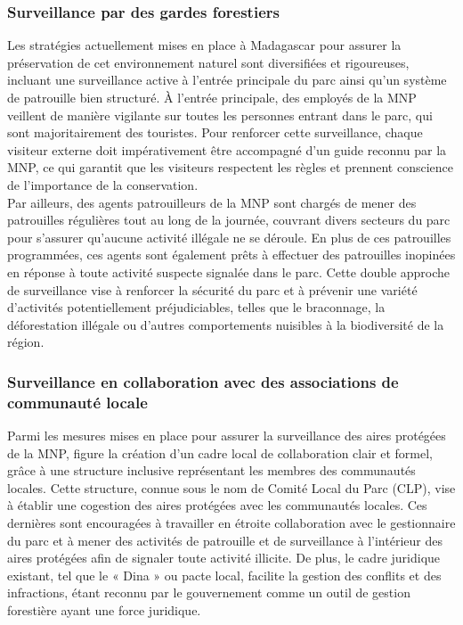 \subsubsection{Surveillance par des gardes forestiers}
Les stratégies actuellement mises en place à Madagascar pour assurer la préservation de cet environnement naturel sont diversifiées et rigoureuses, incluant une surveillance active à l'entrée principale du parc ainsi qu'un système de patrouille bien structuré. À l'entrée principale, des employés de la MNP veillent de manière vigilante sur toutes les personnes entrant dans le parc, qui sont majoritairement des touristes. Pour renforcer cette surveillance, chaque visiteur externe doit impérativement être accompagné d'un guide reconnu par la MNP, ce qui garantit que les visiteurs respectent les règles et prennent conscience de l'importance de la conservation. 
\\
Par ailleurs, des agents patrouilleurs de la MNP sont chargés de mener des patrouilles régulières tout au long de la journée, couvrant divers secteurs du parc pour s'assurer qu'aucune activité illégale ne se déroule. En plus de ces patrouilles programmées, ces agents sont également prêts à effectuer des patrouilles inopinées en réponse à toute activité suspecte signalée dans le parc. Cette double approche de surveillance vise à renforcer la sécurité du parc et à prévenir une variété d'activités potentiellement préjudiciables, telles que le braconnage, la déforestation illégale ou d'autres comportements nuisibles à la biodiversité de la région.
 
\subsubsection{Surveillance en collaboration avec des associations de communauté locale} 
Parmi les mesures mises en place pour assurer la surveillance des aires protégées de la MNP, figure la création d'un cadre local de collaboration clair et formel, grâce à une structure inclusive représentant les membres des communautés locales. Cette structure, connue sous le nom de Comité Local du Parc (CLP), vise à établir une cogestion des aires protégées avec les communautés locales. Ces dernières sont encouragées à travailler en étroite collaboration avec le gestionnaire du parc et à mener des activités de patrouille et de surveillance à l'intérieur des aires protégées afin de signaler toute activité illicite. De plus, le cadre juridique existant, tel que le « Dina » ou pacte local, facilite la gestion des conflits et des infractions, étant reconnu par le gouvernement comme un outil de gestion forestière ayant une force juridique.
\\

